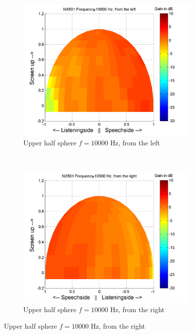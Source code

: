 \begin{figure}[t!]
        \begin{subfigure}[t]{0.5\textwidth}
			    \caption{Upper half sphere $f=10000$ Hz, from the left}
			    \label{fig:res_NX501_pluis_sphere_left}
                \centering
    			\includegraphics[height=0.28\textheight]{afbeeldingen/plots/results/NX501_10000_left.png}
        \end{subfigure}~
        \begin{subfigure}[t]{0.5\textwidth}
			    \caption{Upper half sphere $f=10000$ Hz, from the right}
			    \label{fig:res_NX501_pluis_sphere_right}
                \centering
    			\includegraphics[height=0.28\textheight]{afbeeldingen/plots/results/NX501_10000_right.png}
        \end{subfigure}
\end{figure}
